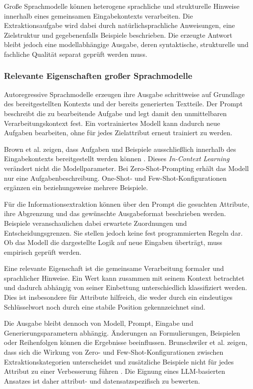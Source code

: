 Große Sprachmodelle können heterogene sprachliche und strukturelle Hinweise innerhalb eines gemeinsamen Eingabekontexts verarbeiten. Die Extraktionsaufgabe wird dabei durch 
natürlichsprachliche Anweisungen, eine Zielstruktur und gegebenenfalls Beispiele beschrieben. Die erzeugte Antwort bleibt jedoch eine modellabhängige Ausgabe, deren syntaktische, 
strukturelle und fachliche Qualität separat geprüft werden muss.

\subsubsection{Relevante Eigenschaften großer Sprachmodelle}

Autoregressive Sprachmodelle erzeugen ihre Ausgabe schrittweise auf Grundlage des bereitgestellten Kontexts und der bereits generierten Textteile. Der Prompt beschreibt die zu 
bearbeitende Aufgabe und legt damit den unmittelbaren Verarbeitungskontext fest. Ein vortrainiertes Modell kann dadurch neue Aufgaben bearbeiten, ohne für jedes Zielattribut erneut 
trainiert zu werden.

Brown et al. zeigen, dass Aufgaben und Beispiele ausschließlich innerhalb des Eingabekontexts bereitgestellt werden können \cite{brown2020language}. Dieses \emph{In-Context Learning} 
verändert nicht die Modellparameter. Bei Zero-Shot-Prompting erhält das Modell nur eine Aufgabenbeschreibung. One-Shot- und Few-Shot-Konfigurationen ergänzen ein beziehungsweise 
mehrere Beispiele.

Für die Informationsextraktion können über den Prompt die gesuchten Attribute, ihre Abgrenzung und das gewünschte Ausgabeformat beschrieben werden. Beispiele veranschaulichen 
dabei erwartete Zuordnungen und Entscheidungsgrenzen. Sie stellen jedoch keine fest programmierten Regeln dar. Ob das Modell die dargestellte Logik auf neue Eingaben überträgt, 
muss empirisch geprüft werden.

Eine relevante Eigenschaft ist die gemeinsame Verarbeitung formaler und sprachlicher Hinweise. Ein Wert kann zusammen mit seinem Kontext betrachtet und dadurch abhängig von 
seiner Einbettung unterschiedlich klassifiziert werden. Dies ist insbesondere für Attribute hilfreich, die weder durch ein eindeutiges Schlüsselwort noch durch eine stabile 
Position gekennzeichnet sind.

Die Ausgabe bleibt dennoch von Modell, Prompt, Eingabe und Generierungsparametern abhängig. Änderungen an Formulierungen, Beispielen oder Reihenfolgen können die Ergebnisse 
beeinflussen. Brunschwiler et al. zeigen, dass sich die Wirkung von Zero- und Few-Shot-Konfigurationen zwischen Extraktionskategorien unterscheidet und zusätzliche Beispiele 
nicht für jedes Attribut zu einer Verbesserung führen \cite{brunschwiler2025enhancing}. Die Eignung eines LLM-basierten Ansatzes ist daher attribut- und datensatzspezifisch 
zu bewerten.

